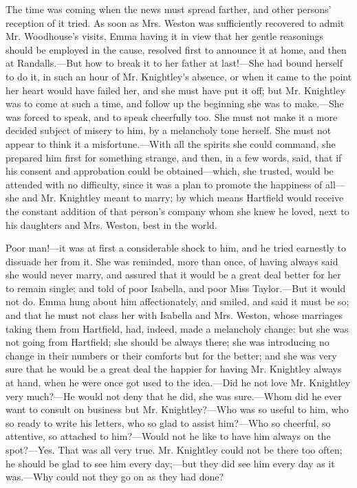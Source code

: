 
The time was coming when the news must spread farther, and other persons' reception of it tried. As soon as Mrs. Weston was sufficiently recovered to admit Mr. Woodhouse's visits, Emma having it in view that her gentle reasonings should be employed in the cause, resolved first to announce it at home, and then at Randalls.---But how to break it to her father at last!---She had bound herself to do it, in such an hour of Mr. Knightley's absence, or when it came to the point her heart would have failed her, and she must have put it off; but Mr. Knightley was to come at such a time, and follow up the beginning she was to make.---She was forced to speak, and to speak cheerfully too. She must not make it a more decided subject of misery to him, by a melancholy tone herself. She must not appear to think it a misfortune.---With all the spirits she could command, she prepared him first for something strange, and then, in a few words, said, that if his consent and approbation could be obtained---which, she trusted, would be attended with no difficulty, since it was a plan to promote the happiness of all---she and Mr. Knightley meant to marry; by which means Hartfield would receive the constant addition of that person's company whom she knew he loved, next to his daughters and Mrs. Weston, best in the world.

Poor man!---it was at first a considerable shock to him, and he tried earnestly to dissuade her from it. She was reminded, more than once, of having always said she would never marry, and assured that it would be a great deal better for her to remain single; and told of poor Isabella, and poor Miss Taylor.---But it would not do. Emma hung about him affectionately, and smiled, and said it must be so; and that he must not class her with Isabella and Mrs. Weston, whose marriages taking them from Hartfield, had, indeed, made a melancholy change: but she was not going from Hartfield; she should be always there; she was introducing no change in their numbers or their comforts but for the better; and she was very sure that he would be a great deal the happier for having Mr. Knightley always at hand, when he were once got used to the idea.---Did he not love Mr. Knightley very much?---He would not deny that he did, she was sure.---Whom did he ever want to consult on business but Mr. Knightley?---Who was so useful to him, who so ready to write his letters, who so glad to assist him?---Who so cheerful, so attentive, so attached to him?---Would not he like to have him always on the spot?---Yes. That was all very true. Mr. Knightley could not be there too often; he should be glad to see him every day;---but they did see him every day as it was.---Why could not they go on as they had done?


